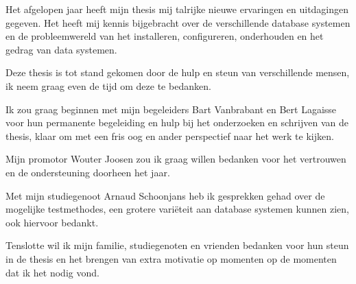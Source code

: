 \documentclass[master=cws,masteroption=gs]{kulemt}
\begin{document}
\setlength{\parindent}{0cm}
\setlength{\parskip}{\baselineskip}

\begin{preface}
Het afgelopen jaar heeft mijn thesis mij talrijke nieuwe ervaringen en uitdagingen gegeven. Het heeft mij kennis bijgebracht over de verschillende database systemen en de probleemwereld van het installeren, configureren, onderhouden en het gedrag van data systemen. 

Deze thesis is tot stand gekomen door de hulp en steun van verschillende mensen, ik neem graag even de tijd om deze te bedanken. 

Ik zou graag beginnen met mijn begeleiders Bart Vanbrabant en Bert Lagaisse voor hun permanente begeleiding en hulp bij het onderzoeken en schrijven van de thesis, klaar om met een fris oog en ander perspectief naar het werk te kijken. 

Mijn promotor Wouter Joosen zou ik graag willen bedanken voor het vertrouwen en de ondersteuning doorheen het jaar. 

Met mijn studiegenoot Arnaud Schoonjans heb ik gesprekken gehad over de mogelijke testmethodes, een grotere variëteit aan database systemen kunnen zien, ook hiervoor bedankt. 

Tenslotte wil ik mijn familie, studiegenoten en vrienden bedanken voor hun steun in de thesis en het brengen van extra motivatie op momenten op de momenten dat ik het nodig vond. 

  
\end{preface}
\end{document}
